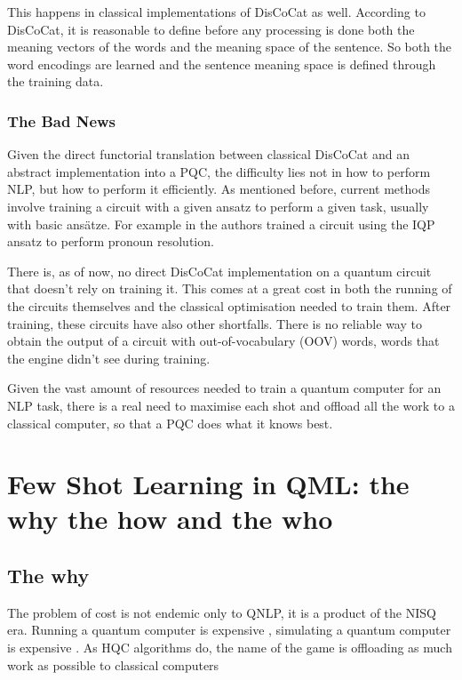 This happens in classical implementations of DisCoCat as well. According to DisCoCat, it is reasonable to define before any processing is done both the meaning vectors of the words and the meaning space of the sentence. So both the word encodings are learned and the sentence meaning space is defined through the training data.

\subsubsection{The Bad News}

Given the direct functorial translation between classical DisCoCat and an abstract implementation into a PQC, the difficulty lies not in how to perform NLP, but how to perform it efficiently. As mentioned before, current methods involve training a circuit with a given ansatz to perform a given task, usually with basic ans{\"a}tze. For example in \cite{wazni_towards_2023} the authors trained a circuit using the IQP ansatz to perform pronoun resolution.

There is, as of now, no direct DisCoCat implementation on a quantum circuit that doesn't rely on training it. This comes at a great cost in both the running of the circuits themselves and the classical optimisation needed to train them. After training, these circuits have also other shortfalls. There is no reliable way to obtain the output of a circuit with out-of-vocabulary (OOV) words, words that the engine didn't see during training.

Given the vast amount of resources needed to train a quantum computer for an NLP task, there is a real need to maximise each shot and offload all the work to a classical computer, so that a PQC does what it knows best.

\section{Few Shot Learning in QML: the why the how and the who}
\subsection{The why}
The problem of cost is not endemic only to QNLP, it is a product of the NISQ era. Running a quantum computer is expensive \cite{chauhan_quantum_2022}, simulating a quantum computer is expensive \cite{zhou_what_2020}. As HQC algorithms do, the name of the game is offloading as much work as possible to classical computers

